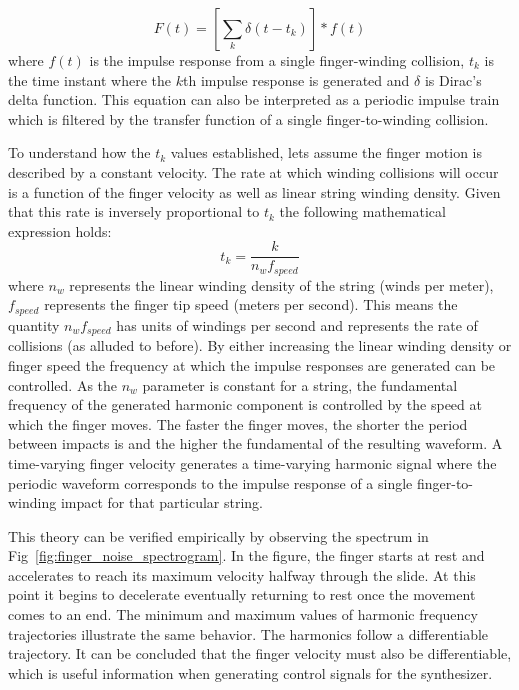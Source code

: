 \documentclass[main.tex]{subfiles}
\begin{document}
\begin{equation}
    F(t) = \left[\sum_k \delta(t-t_k)\right] \ast f(t)
    \label{eqn:harmonic_force}
\end{equation}
where $f(t)$ is the impulse response from a single finger-winding collision, $t_k$ is the time instant where the $k$th impulse response is generated and $\delta$ is Dirac's delta function. This equation can also be interpreted as a periodic impulse train which is filtered by the transfer function of a single finger-to-winding collision.

To understand how the $t_k$ values established, lets assume the finger motion is described by a constant velocity. The rate at which winding collisions will occur is a function of the finger velocity as well as linear string winding density. Given that this rate is inversely proportional to $t_k$ the following mathematical expression holds:
\begin{equation}
    t_k = \frac{k}{n_w f_{speed}}
    \label{eqn:t_k}
\end{equation}
where $n_w$ represents the linear winding density of the string (winds per meter), $f_{speed}$ represents the finger tip speed (meters per second). This means the quantity $n_w f_{speed}$ has units of windings per second and represents the rate of collisions (as alluded to before). By either increasing the linear winding density or finger speed the frequency at which the impulse responses are generated can be controlled. As the $n_w$ parameter is constant for a string, the fundamental frequency of the generated harmonic component is controlled by the speed at which the finger moves. The faster the finger moves, the shorter the period between impacts is and the higher the fundamental of the resulting waveform. A time-varying finger velocity generates a time-varying harmonic signal where the periodic waveform corresponds to the impulse response of a single finger-to-winding impact for that particular string.

This theory can be verified empirically by observing the spectrum in Fig~\ref{fig:finger_noise_spectrogram}. In the figure, the finger starts at rest and accelerates to reach its maximum velocity halfway through the slide. At this point it begins to decelerate eventually returning to rest once the movement comes to an end. The minimum and maximum values of harmonic frequency trajectories illustrate the same behavior. The harmonics follow a differentiable trajectory. It can be concluded that the finger velocity must also be differentiable, which is useful information when generating control signals for the synthesizer. 
\end{document}
